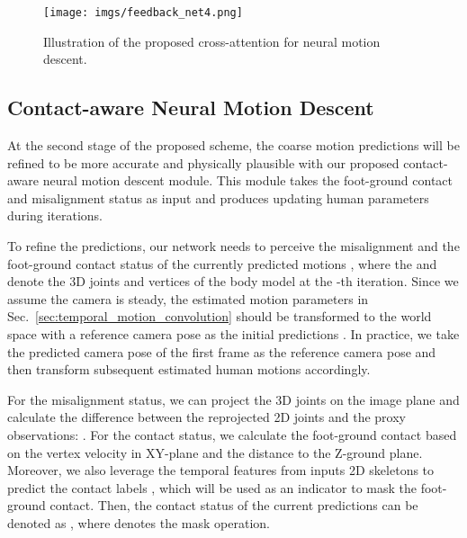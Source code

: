 \documentclass[10pt,twocolumn,letterpaper]{article}
\begin{document}
\begin{figure}[t]
    \centering
    \texttt{[image: imgs/feedback\_net4.png]}
    \caption{Illustration of the proposed cross-attention for neural motion descent. 
}
    \vspace{-5mm}
    \label{fig:feedback_net}
\end{figure}


\subsection{Contact-aware Neural Motion Descent}
\label{sec:contact_neural_motion_descent}

At the second stage of the proposed scheme, the coarse motion predictions will be refined to be more accurate and physically plausible with our proposed contact-aware neural motion descent module.
This module takes the foot-ground contact and misalignment status as input and produces updating human parameters during iterations.


To refine the predictions, our network needs to perceive the misalignment and the foot-ground contact status of the currently predicted motions , where the  and  denote the 3D joints and vertices of the body model at the -th iteration. 
Since we assume the camera is steady, the estimated motion parameters  in Sec.~\ref{sec:temporal_motion_convolution} should be transformed to the world space with a reference camera pose as the initial predictions . In practice, we take the predicted camera pose of the first frame as the reference camera pose and then transform subsequent estimated human motions accordingly.

For the misalignment status, we can project the 3D joints on the image plane and calculate the difference between the reprojected 2D joints and the proxy observations: .
For the contact status, we calculate the foot-ground contact based on the vertex velocity  in XY-plane and the distance  to the Z-ground plane.
Moreover, we also leverage the temporal features from inputs 2D skeletons to predict the contact labels , which will be used as an indicator to mask the foot-ground contact.
Then, the contact status of the current predictions can be denoted as , where  denotes the mask operation.
\end{document}

